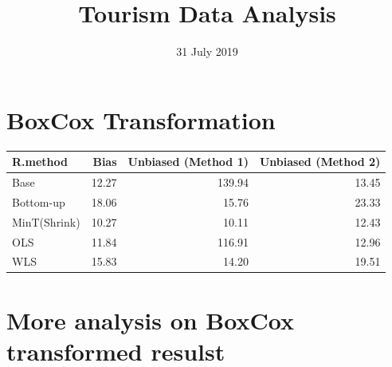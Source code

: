 \documentclass[]{article}
\title{Tourism Data Analysis}
\author{}
\date{31 July 2019}
\begin{document}
\maketitle

\section{BoxCox Transformation}\label{boxcox-transformation}

\begin{tabular}{l|r|r|r}
\hline
R.method & Bias & Unbiased (Method 1) & Unbiased (Method 2)\\
\hline
Base & 12.27 & 139.94 & 13.45\\
\hline
Bottom-up & 18.06 & 15.76 & 23.33\\
\hline
MinT(Shrink) & 10.27 & 10.11 & 12.43\\
\hline
OLS & 11.84 & 116.91 & 12.96\\
\hline
WLS & 15.83 & 14.20 & 19.51\\
\hline
\end{tabular}

\section{More analysis on BoxCox transformed
resulst}\label{more-analysis-on-boxcox-transformed-resulst}
\end{document}
